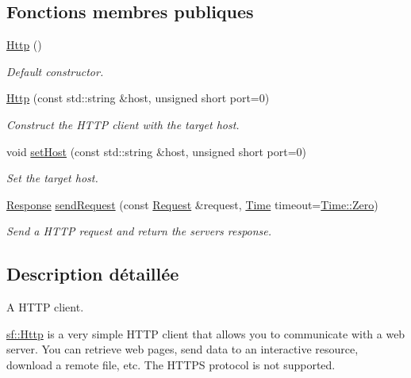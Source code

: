 \subsection*{Fonctions membres publiques}
\begin{DoxyCompactItemize}
\item 
\mbox{\label{classsf_1_1Http_abe2360194f99bdde402c9f97a85cf067}} 
\hyperlink{classsf_1_1Http_abe2360194f99bdde402c9f97a85cf067}{Http} ()
\begin{DoxyCompactList}\small\item\em Default constructor. \end{DoxyCompactList}\item 
\hyperlink{classsf_1_1Http_a79efd844a735f083fcce0edbf1092385}{Http} (const std\+::string \&host, unsigned short port=0)
\begin{DoxyCompactList}\small\item\em Construct the H\+T\+TP client with the target host. \end{DoxyCompactList}\item 
void \hyperlink{classsf_1_1Http_a55121d543b61c41cf20b885a97b04e65}{set\+Host} (const std\+::string \&host, unsigned short port=0)
\begin{DoxyCompactList}\small\item\em Set the target host. \end{DoxyCompactList}\item 
\hyperlink{classsf_1_1Http_1_1Response}{Response} \hyperlink{classsf_1_1Http_aaf09ebfb5e00dcc82e0d494d5c6a9e2a}{send\+Request} (const \hyperlink{classsf_1_1Http_1_1Request}{Request} \&request, \hyperlink{classsf_1_1Time}{Time} timeout=\hyperlink{classsf_1_1Time_a8db127b632fa8da21550e7282af11fa0}{Time\+::\+Zero})
\begin{DoxyCompactList}\small\item\em Send a H\+T\+TP request and return the server\textquotesingle{}s response. \end{DoxyCompactList}\end{DoxyCompactItemize}


\subsection{Description détaillée}
A H\+T\+TP client. 

\hyperlink{classsf_1_1Http}{sf\+::\+Http} is a very simple H\+T\+TP client that allows you to communicate with a web server. You can retrieve web pages, send data to an interactive resource, download a remote file, etc. The H\+T\+T\+PS protocol is not supported.

